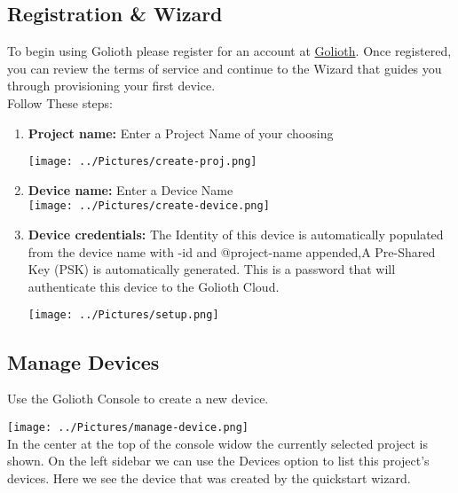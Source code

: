 \documentclass[journal,5pt,twocolumn]{IEEEtran}
\begin{document}
\subsection{\textbf{Registration \& Wizard}}
To begin using Golioth please register for an account at {\href{https://golioth.io/}{Golioth}}.
Once registered, you can review the terms of service and continue to the Wizard that guides you through provisioning your first device.\\
Follow These steps:
\vspace{3mm}

\begin{enumerate}
\item {\textbf{Project name:}}
Enter a Project Name of your choosing\\

\vspace{10mm}

\texttt{[image: ../Pictures/create-proj.png]} 
\vspace{5mm}
\item {\textbf{Device name:}}
Enter a Device Name\\


\texttt{[image: ../Pictures/create-device.png]} 
\vspace{10mm}
\item {\textbf{Device credentials:}}
The Identity of this device is automatically populated from the device name with -id and @project-name appended,A Pre-Shared Key (PSK) is automatically generated. This is a password that will authenticate this device to the Golioth Cloud.



\texttt{[image: ../Pictures/setup.png]} 
\end{enumerate}

\subsection{\textbf{Manage Devices}}
Use the Golioth Console to create a new device.\\

\vspace{5mm}

\texttt{[image: ../Pictures/manage-device.png]} \\

In the center at the top of the console widow the currently selected project is shown. On the left sidebar we can use the Devices option to list this project's devices. Here we see the device that was created by the quickstart wizard.
\end{document}
